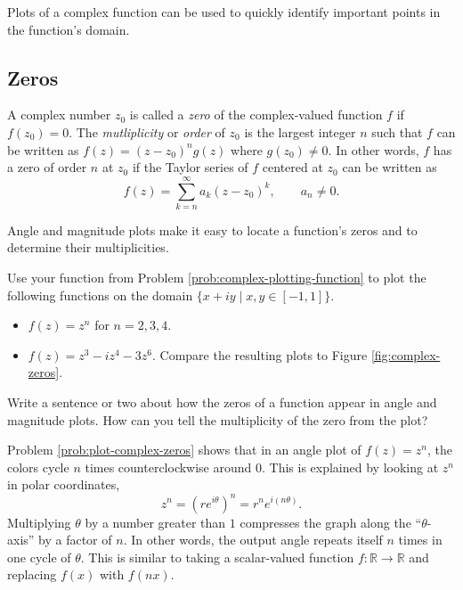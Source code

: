 Plots of a complex function can be used to quickly identify important points in the function's domain.

\subsection*{Zeros} %

A complex number $z_0$ is called a \emph{zero} of the complex-valued function $f$ if $f(z_0) = 0$.
The \emph{mutliplicity} or \emph{order} of $z_0$ is the largest integer $n$ such that $f$ can be written as $f(z) = (z - z_0)^n g(z)$ where $g(z_0) \ne 0$.
In other words, $f$ has a zero of order $n$ at $z_0$ if the Taylor series of $f$ centered at $z_0$ can be written as
\[
f(z) = \sum_{k=n}^{\infty} a_k(z-z_0)^k, \qquad  a_n \neq 0.
\]

Angle and magnitude plots make it easy to locate a function's zeros and to determine their multiplicities.

\begin{problem} %
Use your function from Problem \ref{prob:complex-plotting-function} to plot the following functions on the domain $\{x+iy \mid x,y \in [-1,1]\}$.
\begin{itemize}
\item $f(z) = z^n$ for $n=2,3,4$.
\item $f(z) = z^3 - iz^4 - 3z^6$.
Compare the resulting plots to Figure \ref{fig:complex-zeros}.
\end{itemize}
Write a sentence or two about how the zeros of a function appear in angle and magnitude plots.
How can you tell the multiplicity of the zero from the plot?
\label{prob:plot-complex-zeros}
\end{problem}


Problem \ref{prob:plot-complex-zeros} shows that in an angle plot of $f(z) = z^n$, the colors cycle $n$ times counterclockwise around 0.
This is explained by looking at $z^n$ in polar coordinates,
\[
z^n = (re^{i \theta})^n = r^n e^{i(n\theta)}.
\]
Multiplying $\theta$ by a number greater than $1$ compresses the graph along the ``$\theta$-axis'' by a factor of $n$.
In other words, the output angle repeats itself $n$ times in one cycle of $\theta$.
This is similar to taking a scalar-valued function $f:\mathbb{R}\rightarrow\mathbb{R}$ and replacing $f(x)$ with $f(nx)$.

